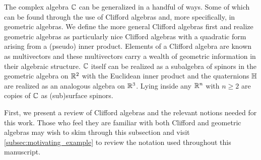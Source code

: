 
The complex algebra $\mathbb{C}$ can be generalized in a handful of ways.  Some of which can be found through the use of Clifford algebras and, more specifically, in geometric algebras.  We define the more general Clifford algebras first and realize geometric algebras as particularly nice Clifford algebras with a quadratic form arising from a (pseudo) inner product. Elements of a Clifford algebra are known as multivectors and these multivectors carry a wealth of geometric information in their algebraic structure. $\mathbb{C}$ itself can be realized as a subalgebra of spinors in the geometric algebra on $\mathbb{R}^2$ with the Euclidean inner product and the quaternions $\mathbb{H}$ are realized as an analogous algebra on $\mathbb{R}^3$. Lying inside any $\mathbb{R}^n$ with $n\geq 2$ are copies of $\mathbb{C}$ as (sub)surface spinors.

First, we present a review of Clifford algebras and the relevant notions needed for this work. Those who feel they are familiar with both Clifford and geometric algebras may wish to skim through this subsection and visit \cref{subsec:motivating_example} to review the notation used throughout this manuscript. 


